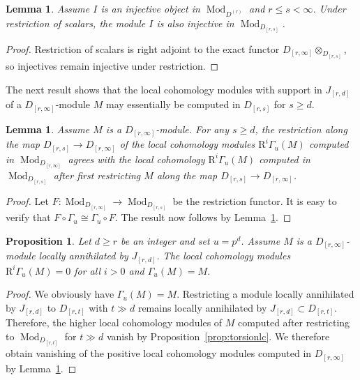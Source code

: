 \documentclass[12pt]{amsart}
\newcommand{\rR}{\mathrm{R}}
\DeclareMathOperator{\Mod}{Mod}
\newcommand{\Dr}{D^{(r)}}
\newcommand{\Drs}{D_{[r,s]}}
\newcommand{\Jrd}{J_{[r,d]}}
\newcommand{\Drinfty}{D_{[r,\infty]}}
\newcommand{\mGau}{\Gamma_{u}}
\numberwithin{equation}{section}
\newtheorem{proposition}[equation]{Proposition}
\newtheorem{lemma}[equation]{Lemma}
\theoremstyle{definition}
\theoremstyle{plain}
\begin{document}
\begin{lemma}\label{lem:restinj}
     Assume $I$ is an injective object in $\Mod_{\Dr}$ and $r \leq s < \infty$. Under restriction of scalars, the module $I$ is also injective in $\Mod_{\Drs}$.
 \end{lemma}
 \begin{proof}
     Restriction of scalars is right adjoint to the exact functor $\Drinfty \otimes_{\Drs}$, so injectives remain injective under restriction.
 \end{proof}

    The next result shows that the local cohomology modules with support in $\Jrd$ of a $\Drinfty$-module $M$
    may essentially be computed in $\Drs$ for $s \geq d$.
 \begin{lemma}\label{lem:drinflc}
    Assume $M$ is a $\Drinfty$-module. For any $s \geq d$, the restriction along the map $\Drs \to \Drinfty$ of the local cohomology modules $\rR^i \mGau(M)$ computed in $\Mod_{\Drinfty}$ agrees with the local cohomology $\rR^i \mGau(M)$ computed in $\Mod_{\Drs}$ after first restricting $M$ along the map $\Drs \to \Drinfty$.
 \end{lemma}
 \begin{proof} 
     Let $F \colon \Mod_{\Drinfty} \to \Mod_{\Drs}$ be the restriction functor. It is easy to verify that $F \circ \mGau \cong \mGau \circ F$. The result now follows by Lemma~\ref{lem:restinj}.
 \end{proof}


 \begin{proposition}\label{prop:torsionlcDr}
     Let $d \geq r$ be an integer and set $u = p^d$. Assume $M$ is a $\Drinfty$-module locally annihilated by $\Jrd$. The local cohomology modules $\rR^i\mGau(M) = 0$ for all $i > 0$ and $\mGau(M) = M$.
 \end{proposition}
 \begin{proof}
 We obviously have $\mGau(M) = M$.
 Restricting a module locally annihilated by $\Jrd$ to $D_{[r,t]}$ with $t \gg d$ remains locally annihilated by $\Jrd \subset D_{[r,t]}$. 
 Therefore, the higher local cohomology modules of $M$ computed after restricting to $\Mod_{D_{[r,t]}}$ for $t \gg d$ vanish by Proposition~\ref{prop:torsionlc}.
 We therefore obtain vanishing of the positive local cohomology modules computed in $\Drinfty$ by Lemma~\ref{lem:drinflc}.
 \end{proof}
\end{document}
